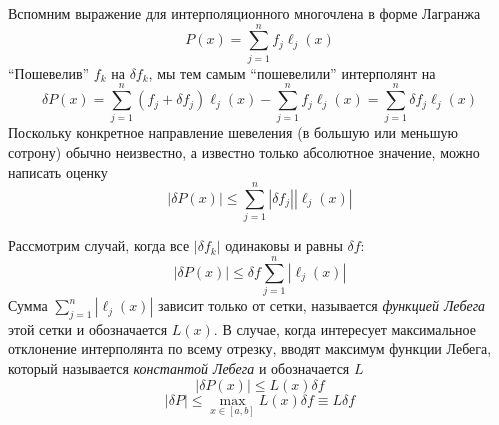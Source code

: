 \documentclass[professionalfonts,compress,unicode]{beamer}
\begin{document}
{
	Вспомним выражение для интерполяционного многочлена в форме Лагранжа
	$$
	P(x) = \sum_{j=1}^n f_j \ell_j(x)
	$$
	``Пошевелив'' $f_k$ на $\delta f_k$, мы тем самым ``пошевелили'' интерполянт на 
	$$
	\delta P(x) = \sum_{j=1}^n (f_j+\delta f_j) \ell_j(x) - \sum_{j=1}^n f_j \ell_j(x) = \sum_{j=1}^n \delta f_j \ell_j(x)
	$$
	Поскольку конкретное направление шевеления (в большую или меньшую сотрону) обычно неизвестно, а известно только
	абсолютное значение, можно написать оценку
	$$
	|\delta P(x)| \leq \sum_{j=1}^n |\delta f_j| |\ell_j(x)|
	$$
}

{
	Рассмотрим случай, когда все $|\delta f_k|$ одинаковы и равны $\delta f$:
	$$
	|\delta P(x)| \leq \delta f \sum_{j=1}^n |\ell_j(x)|
	$$
	Сумма $\sum_{j=1}^n |\ell_j(x)|$ зависит только от сетки, называется \emph{функцией Лебега} этой сетки и обозначается $L(x)$.
	В случае, когда интересует максимальное отклонение интерполянта по всему отрезку, вводят максимум функции Лебега, 
	который называется \emph{константой Лебега} и обозначается $L$
	$$
	|\delta P(x)| \leq L(x) \delta f
	$$
	$$
	|\delta P| \leq \max_{x \in [a,b]} L(x)  \delta f \equiv L \delta f
	$$
}
\end{document}
